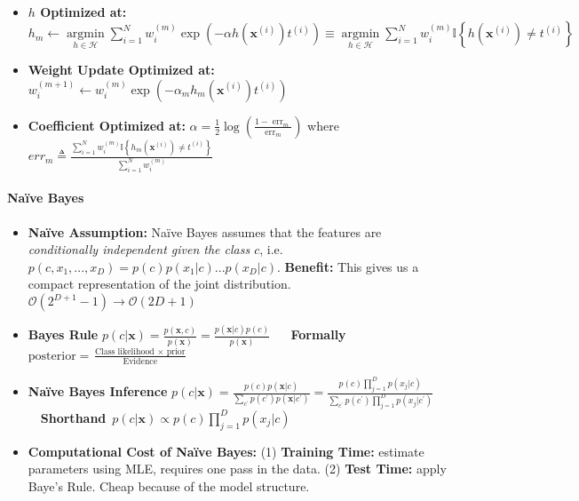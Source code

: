 \documentclass[10pt]{article}
\newcommand{\bx}{\mathbf{x}}
\begin{document}
\begin{itemize}
{\begin{align*}
    \end{align*}}
    \item \textbf{$h$ Optimized at:} $h_{m} \leftarrow \underset{h \in \mathcal{H}}{\operatorname{argmin}} \sum_{i=1}^{N} w_{i}^{(m)} \exp \left(-\alpha h\left(\mathbf{x}^{(i)}\right) t^{(i)}\right) \equiv \underset{h \in \mathcal{H}}{\operatorname{argmin}} \sum_{i=1}^{N} w_{i}^{(m)} \mathbb{I}\left\{h\left(\mathbf{x}^{(i)}\right) \neq t^{(i)}\right\}$
    \item \textbf{Weight Update Optimized at:} $w_{i}^{(m + 1)} \gets w_{i}^{(m)} \exp \left(-\alpha_{m} h_{m}\left(\mathbf{x}^{(i)}\right) t^{(i)}\right)$
    \item \textbf{Coefficient Optimized at:} $\alpha=\frac{1}{2} \log \left(\frac{1-\operatorname{err}_{m}}{\operatorname{err}_{m}}\right)$ \quad where $err_m \triangleq \frac{\sum_{i=1}^{N} w_{i}^{(m)} \mathbb{I}\left\{h_{m}\left(\mathbf{x}^{(i)}\right) \neq t^{(i)}\right\}}{\sum_{i=1}^{N} w_{i}^{(m)}}$
\end{itemize}

\paragraph{Na\"ive Bayes}
\begin{itemize}
    \setlength\itemsep{-0.45em}
    \item \textbf{Na\"ive Assumption:} Na\"ive Bayes assumes that the features are \textit{conditionally independent given the class $c$}, i.e. $p(c, x_1, ..., x_D) = p(c) p(x_1 |c) ... p(x_D|c)$. \textbf{Benefit:} This gives us a compact representation of the joint distribution. $\mathcal{O}({2^{D+1} - 1}) \to  \mathcal{O}(2D + 1)$
    \item \textbf{Bayes Rule} $p(c|\bx) = \frac{p(\bx, c)}{p(\bx)} = \frac{p(\bx |c) p(c)}{p(\bx)}$ ~~ \textbf{Formally}~ $\text{posterior} = \frac{\text{Class likelihood } \times \text{ prior}}{\text{Evidence}}$
    \item \textbf{Na\"ive Bayes Inference} $p(c | \mathbf{x})=\frac{p(c) p(\mathbf{x} | c)}{\sum_{c^{\prime}} p\left(c^{\prime}\right) p\left(\mathbf{x} | c^{\prime}\right)}=\frac{p(c) \prod_{j=1}^{D} p\left(x_{j} | c\right)}{\sum_{c^{\prime}} p\left(c^{\prime}\right) \prod_{j=1}^{D} p\left(x_{j} | c^{\prime}\right)}$ ~~\textbf{Shorthand}~$p(c | \mathbf{x}) \propto p(c) \prod_{j=1}^{D} p\left(x_{j} | c\right)$
    \item \textbf{Computational Cost of Na\"ive Bayes:} (1) \textbf{Training Time:} estimate parameters using MLE, requires one pass in the data. (2) \textbf{Test Time:} apply Baye's Rule. Cheap because of the model structure. 
\end{itemize}
\end{document}
